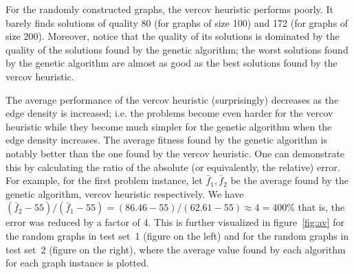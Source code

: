 \documentclass[12pt]{article}
\begin{document}
For the randomly constructed graphs, the vercov heuristic
performs poorly.
It barely finds solutions of quality 80 (for graphs of size 100)
and 172 (for graphs of size 200).
Moreover, notice that the quality of its solutions is dominated
by the quality of the solutions found by the genetic algorithm;
the worst solutions found by the genetic algorithm are almost as
good as the best solutions found by the vercov heuristic.

The average performance of the vercov heuristic (surprisingly)
decreases as the edge density is increased;
i.e. the problems become even harder for the vercov heuristic
while they become much simpler for the genetic algorithm when
the edge density increases.
The average fitness found by the genetic algorithm is notably
better than the one found by the vercov heuristic.
One can demonstrate this by calculating
the ratio of the absolute (or equivalently, the relative) error.
For example, for the first problem instance,
let $\bar{f}_1, \bar{f}_2$ be the average found by
the genetic algorithm, vercov heuristic respectively.
We have $ (\bar{f}_2 - 55) / (\bar{f}_1 - 55) = (86.46 - 55)/(62.61 - 55) \approx 4 = 400\%$
that is, the error was reduced by a factor of 4.
This is further visualized in figure~\ref{fig:av} for the random graphs in
test set~1 (figure on the left) and for the random graphs in test set~2 (figure on the right),
where the average value found by each algorithm
for each graph instance is plotted.
\end{document}

